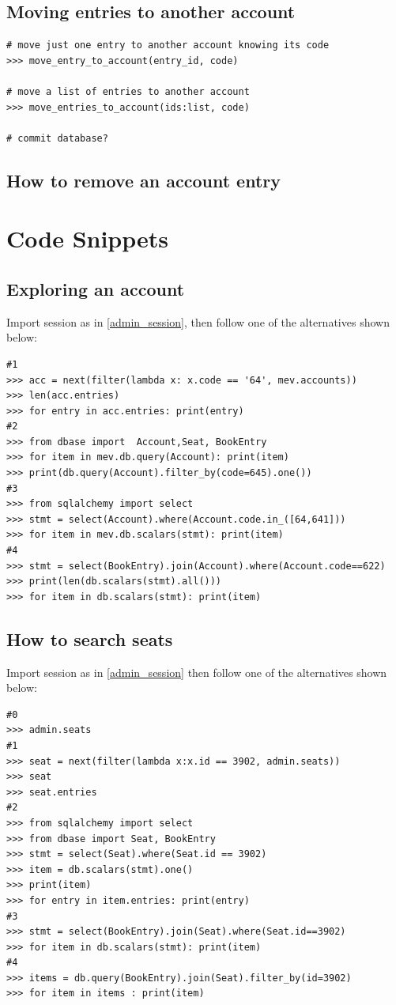 \documentclass[12pt, a4paper]{article}
\begin{document}
\subsection{Moving entries to another account}
\begin{verbatim}
# move just one entry to another account knowing its code
>>> move_entry_to_account(entry_id, code)

# move a list of entries to another account 
>>> move_entries_to_account(ids:list, code)

# commit database?
\end{verbatim}

\subsection{How to remove an account entry}

\appendix
\section{Code Snippets}
\subsection{Exploring an account }
Import session as in \ref{admin_session}, then follow one of the alternatives shown below:
\begin{verbatim}
#1
>>> acc = next(filter(lambda x: x.code == '64', mev.accounts))
>>> len(acc.entries)
>>> for entry in acc.entries: print(entry)
#2
>>> from dbase import  Account,Seat, BookEntry	
>>> for item in mev.db.query(Account): print(item)
>>> print(db.query(Account).filter_by(code=645).one())
#3
>>> from sqlalchemy import select
>>> stmt = select(Account).where(Account.code.in_([64,641]))
>>> for item in mev.db.scalars(stmt): print(item)
#4
>>> stmt = select(BookEntry).join(Account).where(Account.code==622)
>>> print(len(db.scalars(stmt).all()))
>>> for item in db.scalars(stmt): print(item)

\end{verbatim}
 
 
\subsection{How to search seats}
Import session as in \ref{admin_session} then follow one of the alternatives shown below:
\begin{verbatim}
#0
>>> admin.seats
#1
>>> seat = next(filter(lambda x:x.id == 3902, admin.seats))
>>> seat
>>> seat.entries
#2
>>> from sqlalchemy import select
>>> from dbase import Seat, BookEntry
>>> stmt = select(Seat).where(Seat.id == 3902)
>>> item = db.scalars(stmt).one()
>>> print(item)
>>> for entry in item.entries: print(entry)
#3
>>> stmt = select(BookEntry).join(Seat).where(Seat.id==3902)
>>> for item in db.scalars(stmt): print(item)
#4
>>> items = db.query(BookEntry).join(Seat).filter_by(id=3902)
>>> for item in items : print(item)
\end{verbatim}
\end{document}
